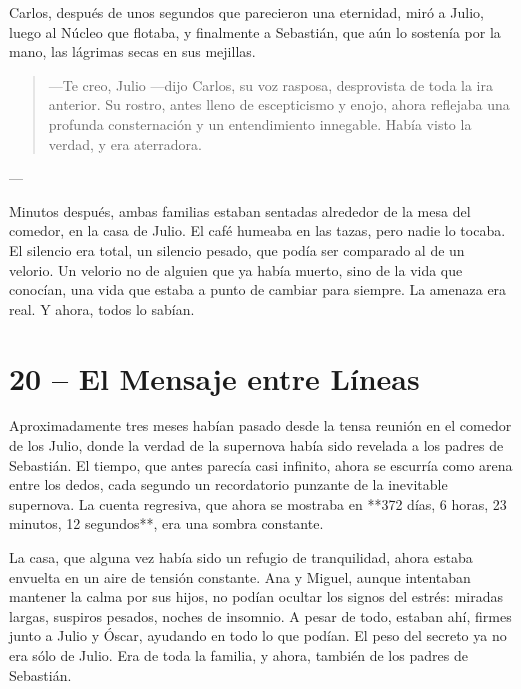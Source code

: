 \documentclass[a4paper,12pt]{book}
\begin{document}
Carlos, después de unos segundos que parecieron una eternidad, miró a Julio, luego al Núcleo que flotaba, y finalmente a Sebastián, que aún lo sostenía por la mano, las lágrimas secas en sus mejillas.

\begin{quote}
    —Te creo, Julio —dijo Carlos, su voz rasposa, desprovista de toda la ira anterior. Su rostro, antes lleno de escepticismo y enojo, ahora reflejaba una profunda consternación y un entendimiento innegable. Había visto la verdad, y era aterradora.
\end{quote}

---

Minutos después, ambas familias estaban sentadas alrededor de la mesa del comedor, en la casa de Julio. El café humeaba en las tazas, pero nadie lo tocaba. El silencio era total, un silencio pesado, que podía ser comparado al de un velorio. Un velorio no de alguien que ya había muerto, sino de la vida que conocían, una vida que estaba a punto de cambiar para siempre. La amenaza era real. Y ahora, todos lo sabían.

\cleardoublepage %

\chapter*{20 – El Mensaje entre Líneas}

Aproximadamente tres meses habían pasado desde la tensa reunión en el comedor de los Julio, donde la verdad de la supernova había sido revelada a los padres de Sebastián. El tiempo, que antes parecía casi infinito, ahora se escurría como arena entre los dedos, cada segundo un recordatorio punzante de la inevitable supernova. La cuenta regresiva, que ahora se mostraba en **372 días, 6 horas, 23 minutos, 12 segundos**, era una sombra constante.

La casa, que alguna vez había sido un refugio de tranquilidad, ahora estaba envuelta en un aire de tensión constante. Ana y Miguel, aunque intentaban mantener la calma por sus hijos, no podían ocultar los signos del estrés: miradas largas, suspiros pesados, noches de insomnio. A pesar de todo, estaban ahí, firmes junto a Julio y Óscar, ayudando en todo lo que podían. El peso del secreto ya no era sólo de Julio. Era de toda la familia, y ahora, también de los padres de Sebastián.
\end{document}
